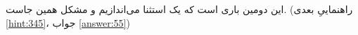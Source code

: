 \section{}
\paragraph{}\label{hint:339}
این دومین باری است که یک استثنا می‌اندازیم و مشکل همین جاست. (راهنماییِ بعدی \ref{hint:345}، جواب \ref{answer:55})